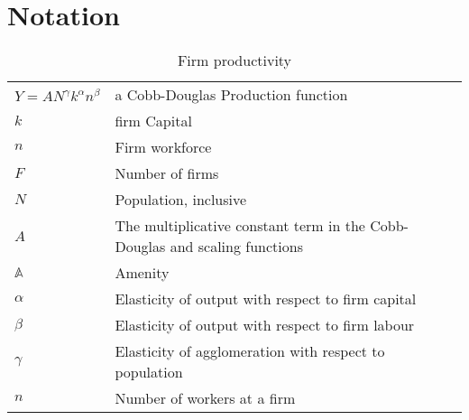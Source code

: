 \chapter{Notation}

\begin{longtable}{lp{10cm}}
\caption{Firm productivity}                       \\
\hline
$Y=AN^\gamma k^{\alpha }n^{\beta }$  &  a Cobb-Douglas Production function \\ %
$k$              &  firm Capital               \\ 
$n$              &  Firm workforce               \\
$F$              &  Number of firms\\
$N$              &  Population, inclusive \\ %
$A$              &  The multiplicative constant term in the Cobb-Douglas and scaling functions \\
$\mathbb{A}$     &  Amenity \\
$\alpha$         &  Elasticity of output with respect to firm capital          \\
$\beta$          &  Elasticity of output with respect to firm labour           \\ %
$\gamma$         &  Elasticity of agglomeration with respect to population    \\ %

$n$  &  Number of workers at a firm \\


\end{longtable}
